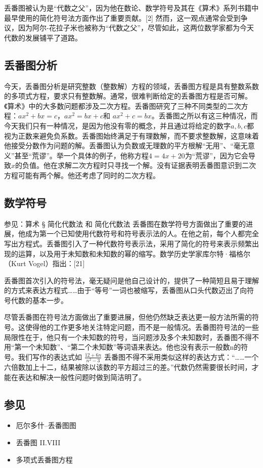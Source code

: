 丢番图被认为是“代数之父”，因为他在数论、数学符号及其在《算术》系列书籍中最早使用的简化符号法方面作出了重要贡献。[2] 然而，这一观点通常会受到争议，因为阿尔-花拉子米也被称为“代数之父”，尽管如此，这两位数学家都为今天代数的发展铺平了道路。
\subsection{丢番图分析}    
今天，丢番图分析是研究整数（整数解）方程的领域，丢番图方程是具有整数系数的多项式方程，要求只有整数解。通常，很难判断给定的丢番图方程是否可解。《算术》中的大多数问题都涉及二次方程。丢番图研究了三种不同类型的二次方程：\(ax^2+bx=c\)，\(ax^2=bx+c\)和 \(ax^2+c=bx\)。丢番图之所以有这三种情况，而今天我们只有一种情况，是因为他没有零的概念，并且通过将给定的数字\(a,b,c\)都视为正数来避免负系数。丢番图始终满足于有理数解，而不要求整数解，这意味着他接受分数作为问题的解。丢番图认为负数或无理数的平方根解“无用”、“毫无意义”甚至“荒谬”。举一个具体的例子，他称方程\(4=4x+20\)为“荒谬”，因为它会导致\(x\)的负值。他在求解二次方程时只寻找一个解。没有证据表明丢番图意识到二次方程可能有两个解。他还考虑了同时的二次方程。
\subsection{数学符号}  
参见：算术 § 简化代数法 和 简化代数法  
丢番图在数学符号方面做出了重要的进展，他成为第一个已知使用代数符号和符号表示法的人。在他之前，每个人都完全写出方程式。丢番图引入了一种代数符号表示法，采用了简化的符号来表示频繁出现的运算，以及用于未知数和未知数的幂的缩写。数学历史学家库尔特·福格尔（Kurt Vogel）指出：[21]

丢番图首次引入的符号法，毫无疑问是他自己设计的，提供了一种简短且易于理解的方式来表达方程式……由于“等号”一词也被缩写，丢番图从口头代数迈出了向符号代数的基本一步。

尽管丢番图在符号法方面做出了重要进展，但他仍然缺乏表达更一般方法所需的符号。这使得他的工作更多地关注特定问题，而不是一般情况。丢番图符号法的一些局限性在于，他只有一个未知数的符号，当问题涉及多个未知数时，丢番图不得不用“第一个未知数”、“第二个未知数”等词语来表达。他也没有表示一般数n的符号。我们写作的表达式如 \(\frac{12+6n}{n^2-3}\) 丢番图不得不采用类似这样的表达方式：“……一个六倍数加上十二，结果被除以该数的平方超过三的差。”代数仍然需要很长时间，才能在表达和解决一般性问题时做到简洁明了。
\subsection{参见}  
\begin{itemize}
\item 厄尔多什–丢番图图  
\item 丢番图 II.VIII  
\item 多项式丢番图方程
\end{itemize}